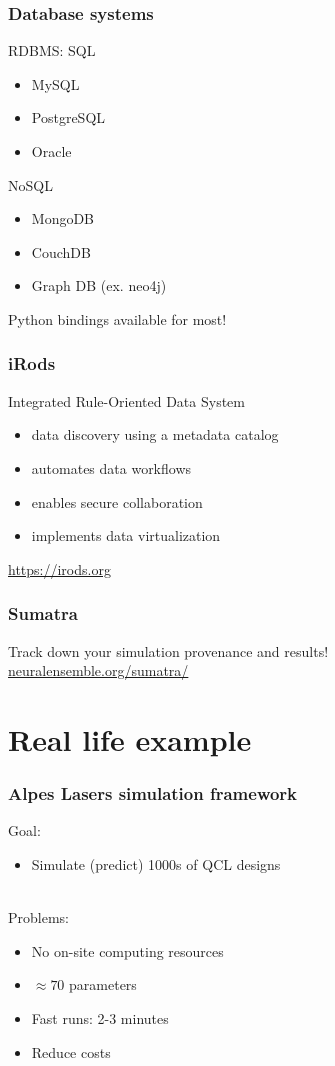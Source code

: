 \documentclass[14pt,notes]{beamer}
\begin{document}
\begin{frame}
\frametitle{Database systems}
RDBMS: SQL
\begin{itemize}
\item MySQL
\item PostgreSQL
\item Oracle
\end{itemize}
NoSQL
\begin{itemize}
\item MongoDB
\item CouchDB
\item Graph DB (ex. neo4j)
\end{itemize}
Python bindings available for most!
\end{frame}

\begin{frame}
\frametitle{iRods}
Integrated Rule-Oriented Data System
\begin{itemize}
\item data discovery using a metadata catalog
\item automates data workflows
\item enables secure collaboration
\item implements data virtualization
\end{itemize}
\url{https://irods.org}
\end{frame}

\begin{frame}
\frametitle{Sumatra}
Track down your simulation provenance and results!\\
\url{neuralensemble.org/sumatra/}
\end{frame}

\section{Real life example}
\begin{frame}
\frametitle{Alpes Lasers simulation framework}
Goal:
\begin{itemize}
\item Simulate (predict) 1000s of QCL designs
\end{itemize}
~\\Problems:
\begin{itemize}
\item No on-site computing resources
\item $\approx70$ parameters
\item Fast runs: 2-3 minutes
\item Reduce costs
\end{itemize}
\end{frame}
\end{document}
